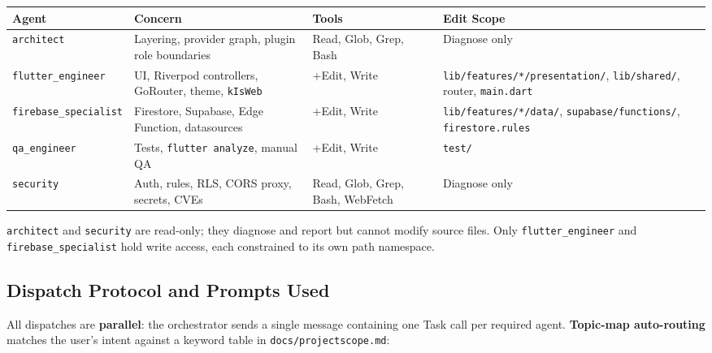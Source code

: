 \documentclass[11pt,a4paper]{article}
\begin{document}
\vspace{4pt}
\begin{tabularx}{\textwidth}{@{}L{2.6cm} L{3.4cm} L{2.6cm} L{5.0cm}@{}}
  \toprule
  \textbf{Agent} & \textbf{Concern} & \textbf{Tools} & \textbf{Edit Scope} \\
  \midrule
  \texttt{architect} & Layering, provider graph, plugin role boundaries &
    Read, Glob, Grep, Bash & Diagnose only \\
  \texttt{flutter\_engineer} & UI, Riverpod controllers, GoRouter, theme, \texttt{kIsWeb} &
    +Edit, Write & \texttt{lib/features/*/presentation/}, \texttt{lib/shared/}, router, \texttt{main.dart} \\
  \texttt{firebase\_specialist} & Firestore, Supabase, Edge Function, datasources &
    +Edit, Write & \texttt{lib/features/*/data/}, \texttt{supabase/functions/}, \texttt{firestore.rules} \\
  \texttt{qa\_engineer} & Tests, \texttt{flutter analyze}, manual QA &
    +Edit, Write & \texttt{test/} \\
  \texttt{security} & Auth, rules, RLS, CORS proxy, secrets, CVEs &
    Read, Glob, Grep, Bash, WebFetch & Diagnose only \\
  \bottomrule
\end{tabularx}
\vspace{2pt}

\texttt{architect} and \texttt{security} are read-only; they diagnose and report but
cannot modify source files. Only \texttt{flutter\_engineer} and
\texttt{firebase\_specialist} hold write access, each constrained to its own path namespace.

\subsection{Dispatch Protocol and Prompts Used}

All dispatches are \textbf{parallel}: the orchestrator sends a single message containing
one Task call per required agent. \textbf{Topic-map auto-routing} matches the user's intent
against a keyword table in \texttt{docs/projectscope.md}:
\end{document}
